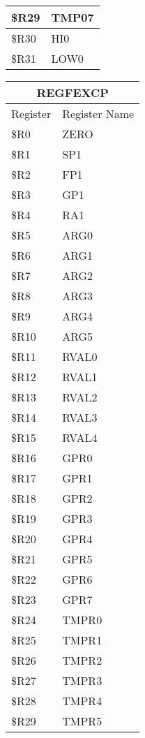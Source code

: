 \documentclass[letterpaper, 11pt]{article}
\begin{document}
\begin{figure}[!h]
{\begin{tabular}{|l|l|}
				\$R29 & TMP07  \\ \hline
				\$R30 & HI0  \\ \hline
				\$R31 & LOW0  \\ \hline
			\end{tabular}
		}
		\hfill
		\parbox{0\linewidth}{
			\centering
			\fontsize{6}{8}\selectfont
			\begin{tabular}{|l|l|}
				\hline
				\multicolumn{2}{|c|}{REGFEXCP} \\
				\hline
				Register & Register Name \\ \hline
				\$R0  & ZERO \\ 	\hline
				\$R1  & SP1 \\ 	\hline
				\$R2  & FP1 \\ 	\hline
				\$R3  & GP1 \\ 	\hline
				\$R4  & RA1 \\ 	\hline
				\$R5  & ARG0 \\ 	\hline
				\$R6  & ARG1 \\ 	\hline
				\$R7  & ARG2 \\ 	\hline
				\$R8  & ARG3 \\ 	\hline
				\$R9  & ARG4 \\ 	\hline
				\$R10 & ARG5 \\ \hline
				\$R11 & RVAL0  \\ \hline
				\$R12 & RVAL1  \\ \hline
				\$R13 & RVAL2  \\ \hline
				\$R14 & RVAL3  \\ \hline
				\$R15 & RVAL4  \\ \hline
				\$R16 & GPR0  \\ \hline
				\$R17 & GPR1  \\ \hline
				\$R18 & GPR2  \\ \hline
				\$R19 & GPR3  \\ \hline
				\$R20 & GPR4  \\ \hline
				\$R21 & GPR5  \\ \hline
				\$R22 & GPR6  \\ \hline
				\$R23 & GPR7  \\ \hline
				\$R24 & TMPR0  \\ \hline
				\$R25 & TMPR1  \\ \hline
				\$R26 & TMPR2  \\ \hline
				\$R27 & TMPR3  \\ \hline
				\$R28 & TMPR4  \\ \hline
				\$R29 & TMPR5  \\ \hline

\end{tabular}}
\end{figure}
\end{document}
